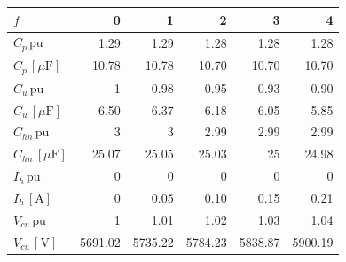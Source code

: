 \begin{tabular}{lrrrrr}
\toprule
$f$ & 0 & 1 & 2 & 3 & 4 \\
\midrule
$C_p \, \mathrm{pu}$ & 1.29 & 1.29 & 1.28 & 1.28 & 1.28 \\
$C_p \, [\mu\mathrm{F}]$ & 10.78 & 10.78 & 10.70 & 10.70 & 10.70 \\
$C_u \, \mathrm{pu}$ & 1 & 0.98 & 0.95 & 0.93 & 0.90 \\
$C_u \, [\mu\mathrm{F}]$ & 6.50 & 6.37 & 6.18 & 6.05 & 5.85 \\
$C_{hn} \, \mathrm{pu}$ & 3 & 3 & 2.99 & 2.99 & 2.99 \\
$C_{hn} \, [\mu\mathrm{F}]$ & 25.07 & 25.05 & 25.03 & 25 & 24.98 \\
$I_{h} \, \mathrm{pu}$ & 0 & 0 & 0 & 0 & 0 \\
$I_{h} \, [\mathrm{A}]$ & 0 & 0.05 & 0.10 & 0.15 & 0.21 \\
$V_{cu} \, \mathrm{pu}$ & 1 & 1.01 & 1.02 & 1.03 & 1.04 \\
$V_{cu} \, [\mathrm{V}]$ & 5691.02 & 5735.22 & 5784.23 & 5838.87 & 5900.19 \\
\bottomrule
\end{tabular}